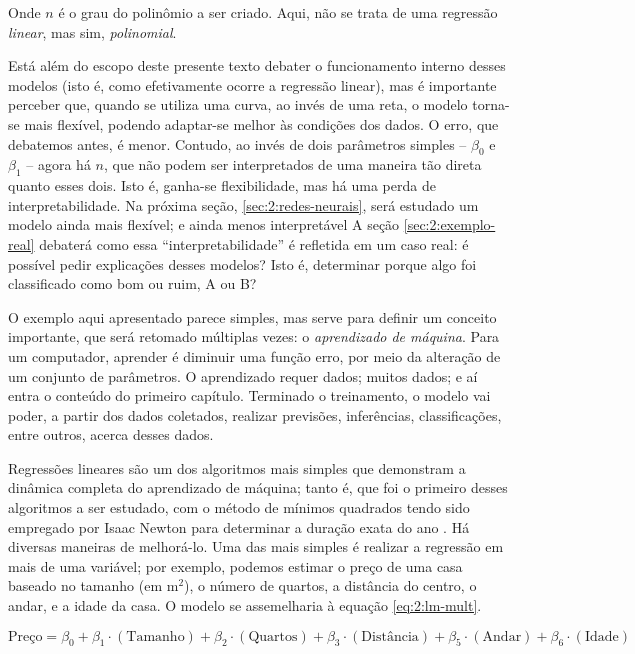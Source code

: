 Onde $n$ é o grau do polinômio a ser criado.
Aqui, não se trata de uma regressão \textit{linear}, mas sim, \textit{polinomial}.

Está além do escopo deste presente texto debater o funcionamento interno desses modelos (isto é, como efetivamente ocorre a regressão linear), mas é importante perceber que, quando se utiliza uma curva, ao invés de uma reta, o modelo torna-se mais flexível, podendo adaptar-se melhor às condições dos dados.
O erro, que debatemos antes, é menor.
Contudo, ao invés de dois parâmetros simples -- $\beta_0$ e $\beta_1$ -- agora há $n$, que não podem ser interpretados de uma maneira tão direta quanto esses dois.
Isto é, ganha-se flexibilidade, mas há uma perda de interpretabilidade.
Na próxima seção, \ref{sec:2:redes-neurais}, será estudado um modelo ainda mais flexível; e ainda menos interpretável
A seção \ref{sec:2:exemplo-real} debaterá como essa ``interpretabilidade'' é refletida em um caso real: é possível pedir explicações desses modelos?
Isto é, determinar porque algo foi classificado como bom ou ruim, A ou B?

O exemplo aqui apresentado parece simples, mas serve para definir um conceito importante, que será retomado múltiplas vezes: o \textit{aprendizado de máquina}.
Para um computador, aprender é diminuir uma função erro, por meio da alteração de um conjunto de parâmetros.
O aprendizado requer dados; muitos dados; e aí entra o conteúdo do primeiro capítulo.
Terminado o treinamento, o modelo vai poder, a partir dos dados coletados, realizar previsões, inferências, classificações, entre outros, acerca desses dados.

Regressões lineares são um dos algoritmos mais simples que demonstram a dinâmica completa do aprendizado de máquina; tanto é, que foi o primeiro desses algoritmos a ser estudado, com o método de mínimos quadrados tendo sido empregado por Isaac Newton para determinar a duração exata do ano \cite{belenkiy_groping_2016}.
Há diversas maneiras de melhorá-lo.
Uma das mais simples é realizar a regressão em mais de uma variável; por exemplo, podemos estimar o preço de uma casa baseado no tamanho (em $\text{m}^2$), o número de quartos, a distância do centro, o andar, e a idade da casa.
O modelo se assemelharia à equação \ref{eq:2:lm-mult}.

\begin{equation}
\label{eq:2:lm-mult}
\text{Preço} = \beta_0 + \beta_1 \cdot (\text{Tamanho}) + \beta_2 \cdot (\text{Quartos}) + \beta_3\cdot (\text{Distância}) + \beta_5 \cdot (\text{Andar}) + \beta_6 \cdot (\text{Idade})
\end{equation}

